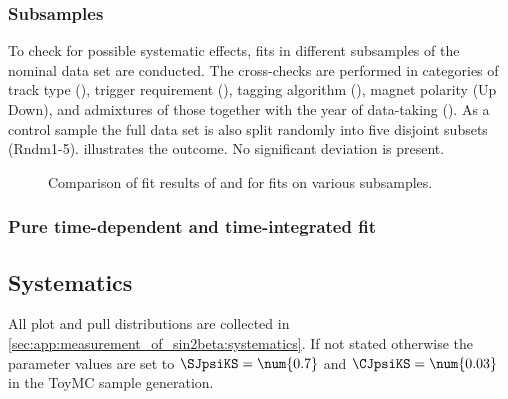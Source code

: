 \subsubsection{Subsamples}
\label{sec:measurement_of_sin2beta:systematics:cross_checks:subsamples}
%
To check for possible systematic effects, fits in different subsamples of the
nominal data set are conducted. The cross-checks are performed in categories of
track type (\catDD \vs \catLL), trigger requirement (\catAU \vs \catEB), tagging
algorithm (\catOS \vs \catSS \vs \catBS), magnet polarity (Up \vs Down), and
admixtures of those together with the year of data-taking (\catOO \vs \catOT).
As a control sample the full data set is also split randomly into five disjoint
subsets (Rndm1-5). 
illustrates the outcome. No significant deviation is present.
%
\begin{figure}
\centering


\caption{
Comparison of fit results of \SJpsiKS and \CJpsiKS for fits on various
subsamples.}
\label{fig:measurement_of_sin2beta:systematics:cross_checks:subsamples:s_and_c}
\end{figure}

\subsubsection{Pure time-dependent and time-integrated fit}
\label{sec:measurement_of_sin2beta:systematics:cross_checks:time_integrated}


\subsection{Systematics}
\label{sec:measurement_of_sin2beta:systematics:systematics}


All plot and pull distributions are collected in
\cref{sec:app:measurement_of_sin2beta:systematics}. If not stated otherwise the
\CP parameter values are set to $\SJpsiKS = \num{0.7}$ and $\CJpsiKS =
\num{0.03}$ in the \acf{ToyMC} sample generation.

